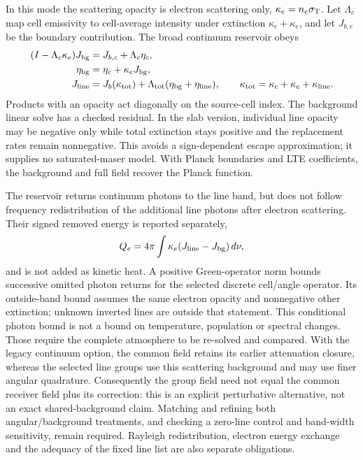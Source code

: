 \documentclass[10pt,a4paper]{article}
\begin{document}
In this mode the scattering opacity is electron scattering only,
$\kappa_e=n_e\sigma_{\rm T}$. Let $\Lambda_c$ map cell emissivity to
cell-average intensity under extinction $\kappa_c+\kappa_e$, and let
$J_{b,c}$ be the boundary contribution. The broad continuum reservoir obeys
\begin{align}
 (I-\Lambda_c\kappa_e)J_{\rm bg}
     &=J_{b,c}+\Lambda_c\eta_c,\nonumber\\
 \eta_{\rm bg}&=\eta_c+\kappa_eJ_{\rm bg},\nonumber\\
 J_{\rm line}&=J_b(\kappa_{\rm tot})
       +\Lambda_{\rm tot}(\eta_{\rm bg}+\eta_{\rm line}),\qquad
 \kappa_{\rm tot}=\kappa_c+\kappa_e+\kappa_{\rm line}.
 \label{eq:infrared_background}
\end{align}
Products with an opacity act diagonally on the source-cell index. The
background linear solve has a checked residual. In the slab version, individual line opacity may
be negative only while total extinction stays positive and the replacement
rates remain nonnegative. This avoids a sign-dependent escape approximation;
it supplies no saturated-maser model. With Planck boundaries and LTE
coefficients, the background and full field recover the Planck function.

The reservoir returns continuum photons to the line band, but does not
follow frequency redistribution of the additional line photons after
electron scattering. Their signed removed energy is reported separately,
\begin{equation}
 Q_e=4\pi\int\kappa_e(J_{\rm line}-J_{\rm bg})\,d\nu,
 \label{eq:infrared_scattering_energy}
\end{equation}
and is not added as kinetic heat. A positive Green-operator norm bounds
successive omitted photon returns for the selected discrete cell/angle
operator. Its outside-band bound assumes the same electron opacity and
nonnegative other extinction; unknown inverted lines are outside that
statement. This conditional photon bound is not a bound on temperature,
population or spectral changes. Those require the complete atmosphere to
be re-solved and compared. With the legacy continuum option, the common field retains its earlier attenuation closure,
whereas the selected line groups use this scattering background and may use
finer angular quadrature. Consequently the group field need not equal the
common receiver field plus its correction: this is an explicit perturbative
alternative, not an exact shared-background claim. Matching and refining
both angular/background treatments, and checking a zero-line control and
band-width sensitivity, remain required. Rayleigh redistribution, electron
energy exchange and the adequacy of the fixed line list are also separate
obligations.
\end{document}
